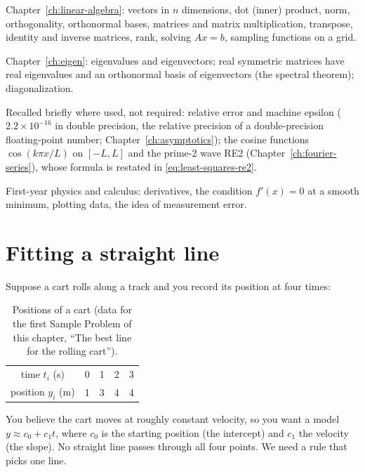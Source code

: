 \begin{prerequisites}
\item Chapter~\ref{ch:linear-algebra}: vectors in $n$ dimensions, dot (inner) product, norm, orthogonality, orthonormal bases, matrices and matrix multiplication, transpose, identity and inverse matrices, rank, solving $Ax=b$, sampling functions on a grid.
\item Chapter~\ref{ch:eigen}: eigenvalues and eigenvectors; real symmetric matrices have real eigenvalues and an orthonormal basis of eigenvectors (the spectral theorem); diagonalization.
\item Recalled briefly where used, not required: relative error and machine epsilon ($2.2\times10^{-16}$ in double precision, the relative precision of a double-precision floating-point number; Chapter~\ref{ch:asymptotics}); the cosine functions $\cos(k\pi x/L)$ on $[-L,L]$ and the prime-2 wave RE2 (Chapter~\ref{ch:fourier-series}), whose formula is restated in \cref{eq:least-squares-re2}.
\item First-year physics and calculus: derivatives, the condition $f'(x)=0$ at a smooth minimum, plotting data, the idea of measurement error.
\end{prerequisites}

\section{Fitting a straight line}\label{sec:least-squares-line}

Suppose a cart rolls along a track and you record its position at four times:

\begin{table}[htbp]\centering
\caption{Positions of a cart (data for the first Sample Problem of this chapter, ``The best line for the rolling cart'').}\label{tab:least-squares-cart}
\begin{tabular}{ccccc}\toprule
time $t_i$ (s) & 0 & 1 & 2 & 3\\
position $y_i$ (m) & 1 & 3 & 4 & 4\\\bottomrule
\end{tabular}
\end{table}

You believe the cart moves at roughly constant velocity, so you want a model $y \approx c_0 + c_1 t$, where $c_0$ is the starting position (the intercept) and $c_1$ the velocity (the slope). No straight line passes through all four points. We need a rule that picks one line.

